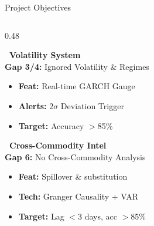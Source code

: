 \documentclass{beamer}
\begin{document}
\begin{frame}[label=objectives]{Project Objectives}
\begin{columns}[T]
\begin{column}{0.48\textwidth}
\begin{tcolorbox}[enhanced, colback=accentorange!3, colframe=gray!15,
  boxrule=0.4pt, arc=4pt, shadow={1pt}{-1pt}{0pt}{black!15},
  borderline west={3pt}{0pt}{accentorange},
  left=5pt, right=5pt, top=4pt, bottom=4pt]
\scriptsize
{\color{accentorange}\bfseries\normalsize {}~Volatility System}\\[2pt]
{\color{black!60}\textbf{Gap 3/4:} Ignored Volatility \& Regimes}
\vspace{0.04cm}
\begin{itemize}\setlength\itemsep{1pt}
\item[\color{accentorange}\faAngleRight] \textbf{Feat:} Real-time GARCH Gauge
\item[\color{accentorange}\faAngleRight] \textbf{Alerts:} $2\sigma$ Deviation Trigger
\item[\color{accentorange}\faAngleRight] \textbf{Target:} Accuracy $>$85\%
\end{itemize}
\end{tcolorbox}

\vspace{0.08cm}

\begin{tcolorbox}[enhanced, colback=accentgreen!3, colframe=gray!15,
  boxrule=0.4pt, arc=4pt, shadow={1pt}{-1pt}{0pt}{black!15},
  borderline west={3pt}{0pt}{accentgreen},
  left=5pt, right=5pt, top=4pt, bottom=4pt]
\scriptsize
{\color{accentgreen}\bfseries\normalsize {}~Cross-Commodity Intel}\\[2pt]
{\color{black!60}\textbf{Gap 6:} No Cross-Commodity Analysis}
\vspace{0.04cm}
\begin{itemize}\setlength\itemsep{1pt}
\item[\color{accentgreen}\faAngleRight] \textbf{Feat:} Spillover \& substitution
\item[\color{accentgreen}\faAngleRight] \textbf{Tech:} Granger Causality + VAR
\item[\color{accentgreen}\faAngleRight] \textbf{Target:} Lag $<$3 days, acc $>$85\%
\end{itemize}
\end{tcolorbox}
\end{column}
\end{columns}

\end{frame}
\end{document}
